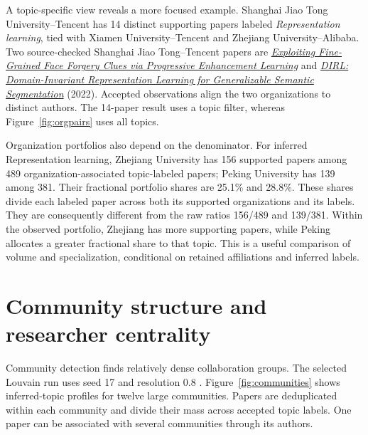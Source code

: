 A topic-specific view reveals a more focused example. Shanghai Jiao Tong
University--Tencent has 14 distinct supporting papers labeled
\emph{Representation learning}, tied with Xiamen University--Tencent and
Zhejiang University--Alibaba. Two source-checked Shanghai Jiao Tong--Tencent
papers are \href{https://doi.org/10.1609/aaai.v36i1.19954}{\emph{Exploiting
Fine-Grained Face Forgery Clues via Progressive Enhancement Learning}} and
\href{https://doi.org/10.1609/aaai.v36i3.20193}{\emph{DIRL: Domain-Invariant
Representation Learning for Generalizable Semantic Segmentation}} (2022).
Accepted observations align the two organizations to distinct authors. The
14-paper result uses a topic filter, whereas Figure~\ref{fig:orgpairs} uses
all topics.

Organization portfolios also depend on the denominator. For inferred
Representation learning, Zhejiang University has 156 supported papers among
489 organization-associated topic-labeled papers; Peking University has
139 among 381. Their fractional portfolio shares are 25.1\% and 28.8\%.
These shares divide each labeled paper across both its supported organizations
and its labels. They are consequently different from the raw ratios 156/489
and 139/381. Within the observed portfolio, Zhejiang has more supporting papers,
while Peking allocates a greater fractional share to that topic. This is a useful
comparison of volume and specialization, conditional on retained affiliations
and inferred labels.

\section{Community structure and researcher centrality}
\label{sec:centrality}
Community detection finds relatively dense collaboration groups. The selected
Louvain run uses seed 17 and resolution 0.8 \citep{blondel2008communities}.
Figure~\ref{fig:communities} shows inferred-topic profiles for twelve large
communities. Papers are deduplicated within each community and divide their
mass across accepted topic labels. One paper can be associated with several
communities through its authors.

\FloatBarrier

